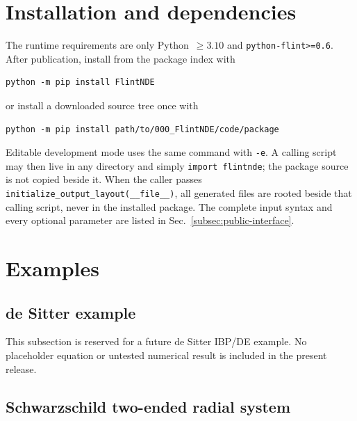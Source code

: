 \documentclass[11pt]{article}
\begin{document}
\section{Installation and dependencies}
\label{sec:installation}

The runtime requirements are only Python~$\geq3.10$ and
\texttt{python-flint>=0.6}.  After publication, install from the package index with
\begin{verbatim}
python -m pip install FlintNDE
\end{verbatim}
or install a downloaded source tree once with
\begin{verbatim}
python -m pip install path/to/000_FlintNDE/code/package
\end{verbatim}
Editable development mode uses the same command with \texttt{-e}.  A calling script may
then live in any directory and simply \texttt{import flintnde}; the package source is not
copied beside it.  When the caller passes \texttt{initialize\_output\_layout(\_\_file\_\_)},
all generated files are rooted beside that calling script, never in the installed package.
The complete input syntax and every optional parameter are listed in
Sec.~\ref{subsec:public-interface}.

\section{Examples}
\label{sec:examples}

\subsection{de Sitter example}

This subsection is reserved for a future de Sitter IBP/DE example.  No placeholder equation
or untested numerical result is included in the present release.

\subsection{Schwarzschild two-ended radial system}
\label{subsec:qnm-example}
\end{document}
